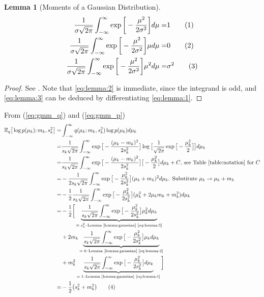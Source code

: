 \documentclass[]{article}
\newcommand{\Expectation} {\mathbb{E}}
\newcommand\numberthis    {\addtocounter{equation}{1}\tag{\theequation}}
\newtheorem{lemma}[thm]{Lemma}
\begin{document}
\begin{lemma}[Moments of a Gaussian Distribution]\label{lemma:gaussian}
	\begin{align*}
		\frac{1}{\sigma\sqrt{2\pi}} \int_{-\infty}^{\infty} \exp{\bigg[-\frac{\mu^2}{2 \sigma^2}\bigg]} d \mu =& 1 \numberthis \label{eq:lemma:1}\\
		\frac{1}{\sigma\sqrt{2\pi}} \int_{-\infty}^{\infty} \exp{\bigg[-\frac{\mu^2}{2 \sigma^2}\bigg]} \mu d \mu =& 0 \numberthis \label{eq:lemma:2}\\
		\frac{1}{\sigma\sqrt{2\pi}} \int_{-\infty}^{\infty} \exp{\bigg[-\frac{\mu^2}{2 \sigma^2}\bigg]} \mu^2 d \mu =& \sigma^2 \numberthis \label{eq:lemma:3}
	\end{align*}
\end{lemma}
\begin{proof}
	See \cite[Equation (5.7.5)]{fisz1963probability}. Note that \eqref{eq:lemma:2} is immediate, since the integrand is odd, and \eqref{eq:lemma:3} can be deduced by differentiating \eqref{eq:lemma:1}.
\end{proof}
From (\ref{eq:gmm_q}) and (\ref{eq:gmm_p})
\begin{align*}
	 \Expectation_q \big[ \log {p(\mu_k);m_k,s_k^2}\big]  =& \int_{-\infty}^{\infty} q(\mu_k;m_k,s_k^2) \log {p(\mu_k)}  d\mu_k\\
	 =& \frac{1}{s_k\sqrt{2\pi}} \int_{-\infty}^{\infty} \exp{\big[-\frac{(\mu_k-m_k)^2}{2 s_k^2}\big]}\log{\big[\frac{1}{\sqrt{2\pi}} \exp{\big[- \frac{\mu_k^2}{2}\big]}\big]} d\mu_k\\
	 =&\frac{1}{s_k\sqrt{2\pi}} \int_{-\infty}^{\infty} \exp{\big[-\frac{(\mu_k-m_k)^2}{2 s_k^2}\big]}\big[ - \frac{\mu_k^2}{2}\big] d\mu_k+ C \text{, see Table \ref{table:notation} for $C$}\\
	 =& - \frac{1}{2 s_k\sqrt{2\pi}} \int_{-\infty}^{\infty} \exp{\big[-\frac{\mu_k^2}{2 s_k^2}\big]}(\mu_k+m_k)^2 d\mu_k \text{. Substitute $\mu_k \rightarrow \mu_k+m_k$}\\
	 =&- \frac{1}{2}\frac{1}{s_k\sqrt{2\pi} } \int_{-\infty}^{\infty} \exp{\big[-\frac{\mu_k^2}{2 s_k^2}\big]}(\mu_k^2 +2 \mu_k m_k + m_k^2) d\mu_k\\
	 =&- \frac{1}{2}\bigg[\underbrace{\frac{1}{s_k\sqrt{2\pi} } \int_{-\infty}^{\infty} \exp{\big[-\frac{\mu_k^2}{2 s_k^2}\big]}\mu_k^2  d\mu_k}_\text{$=s_k^2$--Lemma \ref{lemma:gaussian} \eqref{eq:lemma:3}}\\
	 \;&+2  m_k \underbrace{\frac{1}{s_k\sqrt{2\pi} } \int_{-\infty}^{\infty} \exp{\big[-\frac{\mu_k^2}{2 s_k^2}\big]} \mu_k  d\mu_k}_\text{$=0$--Lemma \ref{lemma:gaussian} \eqref{eq:lemma:2}}\\
	 \;&+m_k^2 \underbrace{\frac{1}{s_k\sqrt{2\pi} } \int_{-\infty}^{\infty} \exp{\big[-\frac{\mu_k^2}{2 s_k^2}\big]} d\mu_k}_\text{$=1$--Lemma \ref{lemma:gaussian} \eqref{eq:lemma:1}}\bigg]\\
	  =&- \frac{1}{2 } \big(s_k^2 +  m_k^2\big) \numberthis \label{eq:ELBO:1}
\end{align*}
\end{document}
